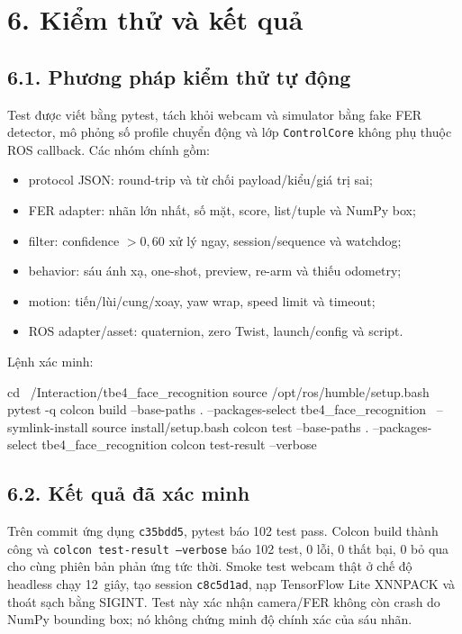 \section*{6. Kiểm thử và kết quả}

\subsection*{6.1. Phương pháp kiểm thử tự động}

Test được viết bằng pytest, tách khỏi webcam và simulator bằng fake FER detector,
mô phỏng số profile chuyển động và lớp \texttt{ControlCore} không phụ thuộc
ROS callback. Các nhóm chính gồm:

\begin{itemize}[leftmargin=1cm,itemsep=0.15em]
  \item protocol JSON: round-trip và từ chối payload/kiểu/giá trị sai;
  \item FER adapter: nhãn lớn nhất, số mặt, score, list/tuple và NumPy box;
  \item filter: confidence $>0,60$ xử lý ngay, session/sequence và watchdog;
  \item behavior: sáu ánh xạ, one-shot, preview, re-arm và thiếu odometry;
  \item motion: tiến/lùi/cung/xoay, yaw wrap, speed limit và timeout;
  \item ROS adapter/asset: quaternion, zero Twist, launch/config và script.
\end{itemize}

Lệnh xác minh:

\begin{svcode}
cd ~/Interaction/tbe4_face_recognition
source /opt/ros/humble/setup.bash
pytest -q
colcon build --base-paths . --packages-select tbe4_face_recognition \
  --symlink-install
source install/setup.bash
colcon test --base-paths . --packages-select tbe4_face_recognition
colcon test-result --verbose
\end{svcode}

\subsection*{6.2. Kết quả đã xác minh}

Trên commit ứng dụng \texttt{c35bdd5}, pytest báo 102 test pass. Colcon build
thành công và \texttt{colcon test-result --verbose} báo 102 test, 0 lỗi,
0 thất bại, 0 bỏ qua cho cùng phiên bản phản ứng tức thời.
Smoke test webcam thật ở chế độ headless chạy 12~giây, tạo session
\texttt{c8c5d1ad}, nạp TensorFlow Lite XNNPACK và thoát sạch bằng SIGINT. Test
này xác nhận camera/FER không còn crash do NumPy bounding box; nó không chứng
minh độ chính xác của sáu nhãn.

